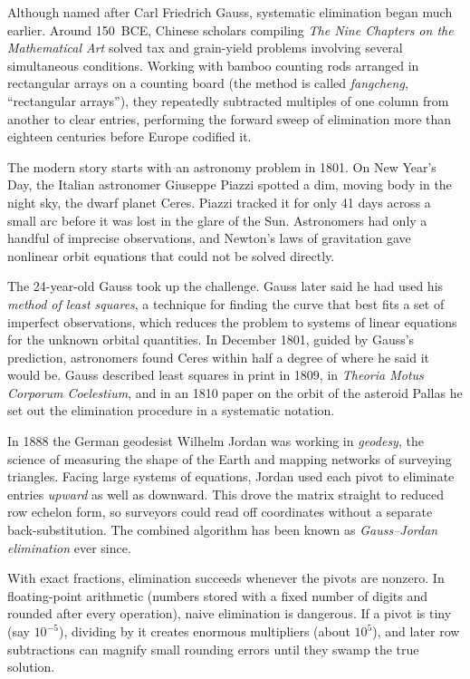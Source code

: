 \begin{historybox}
Although named after Carl Friedrich Gauss, systematic elimination began much earlier.
Around 150~BCE, Chinese scholars compiling \emph{The Nine Chapters on the Mathematical Art}
solved tax and grain-yield problems involving several simultaneous conditions.
Working with bamboo counting rods arranged in rectangular arrays on a counting
board (the method is called \emph{fangcheng}, ``rectangular arrays''),
they repeatedly subtracted multiples of one column from another to clear entries,
performing the forward sweep of elimination more than eighteen centuries before Europe codified it.

The modern story starts with an astronomy problem in 1801. On New Year's Day,
the Italian astronomer Giuseppe Piazzi spotted a dim, moving body in the night sky, the dwarf
planet Ceres. Piazzi tracked it for only 41 days across a small arc before it was lost
in the glare of the Sun. Astronomers had
only a handful of imprecise observations, and Newton's laws of gravitation gave
nonlinear orbit equations that could not be solved directly.

The 24-year-old Gauss took up the challenge. Gauss later said he had used his \emph{method of least
squares}, a technique for finding the curve that best fits a set of
imperfect observations, which reduces the problem to systems of linear equations for the
unknown orbital quantities. In December 1801, guided by Gauss's prediction,
astronomers found Ceres within half a degree of where he said it would be.
Gauss described least squares in print in 1809, in \emph{Theoria Motus Corporum
Coelestium}, and in an 1810 paper on the orbit of the asteroid Pallas he set out the
elimination procedure in a systematic notation.

In 1888 the German geodesist Wilhelm Jordan was working in \emph{geodesy}, the science
of measuring the shape of the Earth and mapping networks of surveying triangles. Facing
large systems of equations, Jordan used each pivot to eliminate entries
\emph{upward} as well as downward. This drove the matrix straight to reduced row
echelon form, so surveyors could read off coordinates without a separate back-substitution.
The combined algorithm has been known as \emph{Gauss--Jordan elimination} ever since.

With exact fractions, elimination succeeds whenever the pivots are nonzero. In
floating-point arithmetic (numbers stored with a fixed number of digits and rounded
after every operation), naive elimination is dangerous. If a pivot is
tiny (say $10^{-5}$), dividing by it creates enormous multipliers (about $10^5$),
and later row subtractions can magnify small rounding errors until they swamp the true solution.


\end{historybox}
